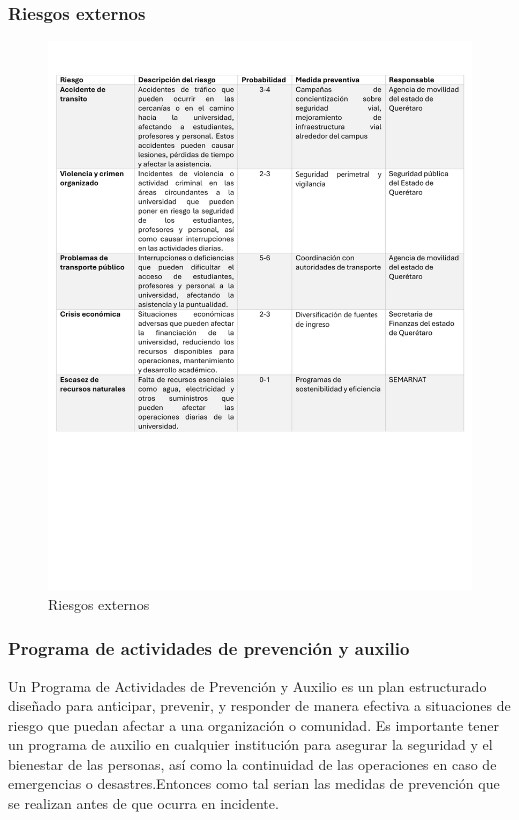 \subsubsection{Riesgos externos}
%
%
\begin{figure}[H]
        \centering
        \includegraphics[trim = {5mm 5mm 5mm 15mm},clip,scale=0.42]{16/Img/riesgosexternosITQ.pdf}
        \caption{Riesgos externos}
        \label{Riesgos externos}
    \end{figure}
%
%
\subsubsection{Programa de actividades de prevención y auxilio}
Un Programa de Actividades de Prevención y Auxilio es un plan estructurado diseñado para anticipar, prevenir, y responder de manera efectiva a situaciones de riesgo que puedan afectar a una organización o comunidad. Es importante tener un programa de auxilio en cualquier institución para asegurar la seguridad y el bienestar de las personas, así como la continuidad de las operaciones en caso de emergencias o desastres.Entonces como tal serian las medidas de prevención que se realizan antes de que ocurra en incidente.
